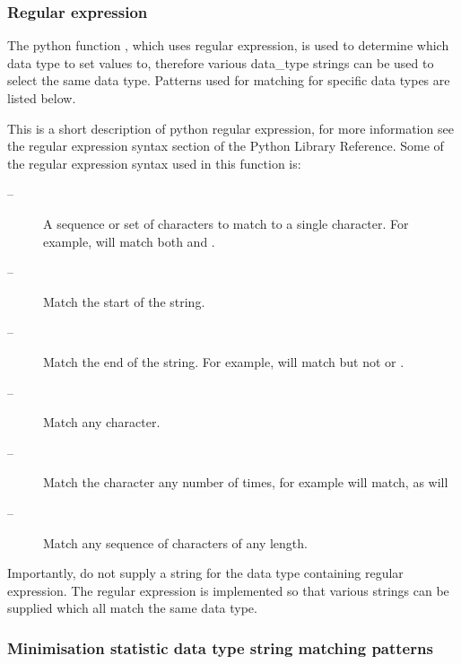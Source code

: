 \subsubsection{Regular expression}

The python function 
, which uses regular expression, is used to determine which data
type to set values to, therefore various data\_type strings can be used to select the same
data type.  Patterns used for matching for specific data types are listed below.

This is a short description of python regular expression, for more information see the
regular expression syntax section of the Python Library Reference.  Some of the regular
expression syntax used in this function is:

\begin{description}
\item[    
 --]   A sequence or set of characters to match to a single character.  For example, 
 will match both 
 and 
. 
\item[    
 --]   Match the start of the string. 
\item[    
 --]   Match the end of the string.  For example, 
 will match 
 but not 
 or 
. 
\item[    
 --]   Match any character. 
\item[    
 --]   Match the character 
 any number of times, for example 
 will match, as will 
 
\item[    
 --]   Match any sequence of characters of any length. 
\end{description}
Importantly, do not supply a string for the data type containing regular expression.  The
regular expression is implemented so that various strings can be supplied which all match
the same data type.


\subsubsection{Minimisation statistic data type string matching patterns}



